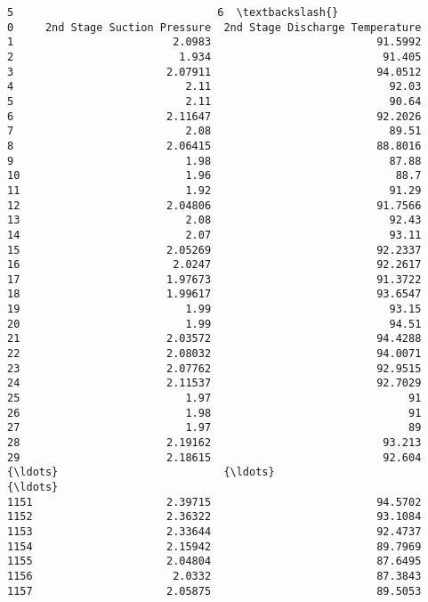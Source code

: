 \documentclass[11pt]{article}
\begin{document}
\begin{tcolorbox}[breakable, size=fbox, boxrule=.5pt, pad at break*=1mm, opacityfill=0]
\begin{Verbatim}[commandchars=\\\{\}]
                               5                                6  \textbackslash{}
0     2nd Stage Suction Pressure  2nd Stage Discharge Temperature
1                         2.0983                          91.5992
2                          1.934                           91.405
3                        2.07911                          94.0512
4                           2.11                            92.03
5                           2.11                            90.64
6                        2.11647                          92.2026
7                           2.08                            89.51
8                        2.06415                          88.8016
9                           1.98                            87.88
10                          1.96                             88.7
11                          1.92                            91.29
12                       2.04806                          91.7566
13                          2.08                            92.43
14                          2.07                            93.11
15                       2.05269                          92.2337
16                        2.0247                          92.2617
17                       1.97673                          91.3722
18                       1.99617                          93.6547
19                          1.99                            93.15
20                          1.99                            94.51
21                       2.03572                          94.4288
22                       2.08032                          94.0071
23                       2.07762                          92.9515
24                       2.11537                          92.7029
25                          1.97                               91
26                          1.98                               91
27                          1.97                               89
28                       2.19162                           93.213
29                       2.18615                           92.604
{\ldots}                          {\ldots}                              {\ldots}
1151                     2.39715                          94.5702
1152                     2.36322                          93.1084
1153                     2.33644                          92.4737
1154                     2.15942                          89.7969
1155                     2.04804                          87.6495
1156                      2.0332                          87.3843
1157                     2.05875                          89.5053

\end{Verbatim}
\end{tcolorbox}
\end{document}
